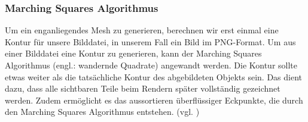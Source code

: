 \subsubsection{Marching Squares Algorithmus}
Um ein enganliegendes Mesh zu generieren, berechnen wir erst einmal eine Kontur für unsere Bilddatei, in unserem Fall ein Bild im PNG-Format. Um aus einer Bilddatei eine Kontur zu generieren, kann der Marching Squares Algorithmus (engl.: wandernde Quadrate) angewandt werden. Die Kontur sollte etwas weiter als die tatsächliche Kontur des abgebildeten Objekts sein. Das dient dazu, dass alle sichtbaren Teile beim Rendern später vollständig gezeichnet werden. Zudem ermöglicht es das aussortieren überflüssiger Eckpunkte, die durch den Marching Squares Algorithmus entstehen. (vgl. \cite{Maple2003})\newline\newline

